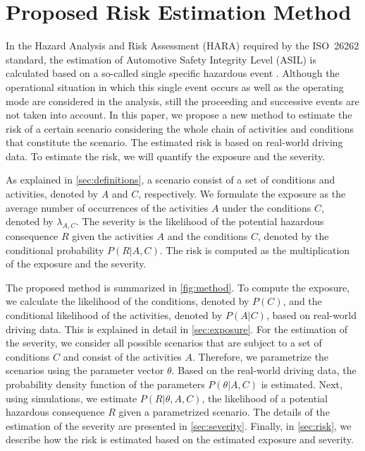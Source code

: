\section{Proposed Risk Estimation Method}
\label{sec:method}
 
In the Hazard Analysis and Risk Assessment (HARA) required by the ISO~26262 standard, the estimation of Automotive Safety Integrity Level (ASIL) is calculated based on a so-called single specific hazardous event \cite{ISO26262}.
Although the operational situation in which this single event occurs as well as the operating mode are considered in the analysis, still the proceeding and successive events are not taken into account.
In this paper, we propose a new method to estimate the risk of a certain scenario considering the whole chain of activities and conditions that constitute the scenario.
The estimated risk is based on real-world driving data. To estimate the risk, we will quantify the exposure and the severity.

As explained in \cref{sec:definitions}, a scenario consist of a set of conditions and activities, denoted by $A$ and $C$, respectively. We formulate the exposure as the average number of occurrences of the activities $A$ under the conditions $C$, denoted by $\lambda_{A,C}$. The severity is the likelihood of the potential hazardous consequence $R$ given the activities $A$ and the conditions $C$, denoted by the conditional probability $P(R|A,C)$. The risk is computed as the multiplication of the exposure and the severity. 

The proposed method is summarized in \cref{fig:method}. To compute the exposure, we calculate the likelihood of the conditions, denoted by $P(C)$, and the conditional likelihood of the activities, denoted by $P(A|C)$, based on real-world driving data. This is explained in detail in \cref{sec:exposure}. For the estimation of the severity, we consider all possible scenarios that are subject to a set of conditions $C$ and consist of the activities $A$. Therefore, we parametrize the scenarios using the parameter vector $\theta$. Based on the real-world driving data, the probability density function of the parameters $P(\theta|A,C)$ is estimated. Next, using simulations, we estimate $P(R|\theta,A,C)$, the likelihood of a potential hazardous consequence $R$ given a parametrized scenario. The details of the estimation of the severity are presented in \cref{sec:severity}. Finally, in \cref{sec:risk}, we describe how the risk is estimated based on the estimated exposure and severity.

